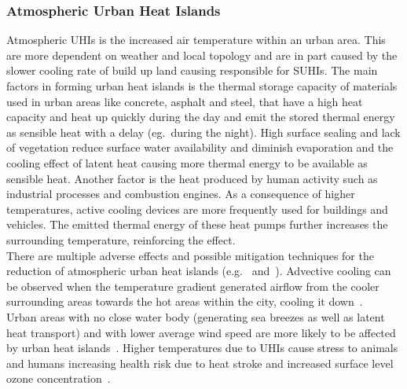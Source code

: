 \documentclass[12pt,a4paper, english,twoside]{article}
\begin{document}
    \subsubsection{Atmospheric Urban Heat Islands}\label{sec:at_uhi}
      Atmospheric \glspl{UHI} is the increased air temperature within an urban area. 
      This are more dependent on weather and local topology and are in part caused by the slower cooling rate of build up land causing responsible for \glspl{SUHI}.
      The main factors in forming urban heat islands is the thermal storage capacity of materials used in urban areas like concrete, asphalt and steel, that have a high heat capacity and heat up quickly during the day and emit the stored thermal energy as sensible heat with a delay (eg.~during the night)\cite{Ramamurthy2014}. 
      High surface sealing and lack of vegetation reduce surface water availability and diminish evaporation and the cooling effect of latent heat causing more thermal energy to be available as sensible heat. %
      Another factor is the heat produced by human activity such as industrial processes and combustion engines.
      As a consequence of higher temperatures, active cooling devices are more frequently used for buildings and vehicles. 
      The emitted thermal energy of these heat pumps further increases the surrounding temperature, reinforcing the effect.
      \\
      There are multiple adverse effects and possible mitigation techniques for the reduction of atmospheric urban heat islands (e.g.~\cite{Nichol1994} and~\cite{Stewart2011}). %
      Advective cooling can be observed when the temperature gradient generated airflow from the cooler surrounding areas towards the hot areas within the city, cooling it down~\cite{HaegerEugensson1999}. \\
      Urban areas with no close water body (generating sea breezes as well as latent heat transport) and with lower average wind speed are more likely to be affected by urban heat islands~\cite{Ramamurthy2017}. 
      Higher temperatures due to \glspl{UHI} cause stress to animals and humans increasing health risk due to heat stroke and increased surface level ozone concentration~\cite{Santamouris2020}.%
\end{document}

